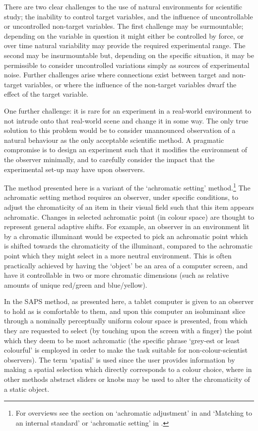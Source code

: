 There are two clear challenges to the use of natural environments for scientific study; the inability to control target variables, and the influence of uncontrollable or uncontrolled non-target variables. The first challenge may be surmountable; depending on the variable in question it might either be controlled by force, or over time natural variability may provide the required experimental range. The second may be insurmountable but, depending on the specific situation, it may be permissible to consider uncontrolled variations simply as sources of experimental noise. Further challenges arise where connections exist between target and non-target variables, or where the influence of the non-target variables dwarf the effect of the target variable.

One further challenge: it is rare for an experiment in a real-world environment to not intrude onto that real-world scene and change it in some way. The only true solution to this problem would be to consider unannounced observation of a natural behaviour as the only acceptable scientific method. A pragmatic compromise is to design an experiment such that it modifies the environment of the observer minimally, and to carefully consider the impact that the experimental set-up may have upon observers.

The method presented here is a variant of the `achromatic setting' method.\footnote{For overviews see %
the section on `achromatic adjustment' in \citet{foster_color_2011} and `Matching to an internal standard' or `achromatic setting' in \citet{smithson_sensory_2005}.} The achromatic setting method requires an observer, under specific conditions, to adjust the chromaticity of an item in their visual field such that this item appears achromatic. Changes in selected achromatic point (in colour space) are thought to represent general adaptive shifts. For example, an observer in an environment lit by a chromatic illuminant would be expected to pick an achromatic point which is shifted towards the chromaticity of the illuminant, compared to the achromatic point which they might select in a more neutral environment. This is often practically achieved by having the `object' be an area of a computer screen, and have it controllable in two or more chromatic dimensions (such as relative amounts of unique red/green and blue/yellow). 

In the \gls{SAPS} method, as presented here, a tablet computer is given to an observer to hold as is comfortable to them, and upon this computer an isoluminant slice through a nominally perceptually uniform colour space is presented, from which they are requested to select (by touching upon the screen with a finger) the point which they deem to be most achromatic (the specific phrase `grey-est or least colourful' is employed in order to make the task suitable for non-colour-scientist observers). The term `spatial' is used since the user provides information by making a spatial selection which directly corresponds to a colour choice, where in other methods abstract sliders or knobs may be used to alter the chromaticity of a static object.

